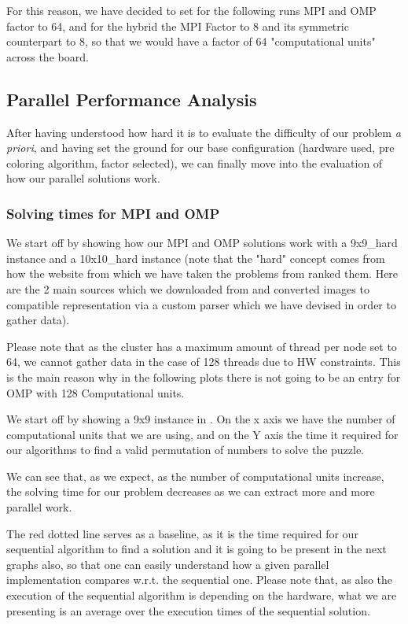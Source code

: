 For this reason, we have decided to set for the following runs MPI and OMP factor to 64, and for the hybrid the MPI Factor to 8 and its symmetric counterpart to 8, so that we would have a factor of 64 "computational units" across the board.


\subsection{Parallel Performance Analysis}
\label{subsec:parallel_performance_analysis}

After having understood how hard it is to evaluate the difficulty of our problem \textit{a priori}, and having set the ground for our base configuration (hardware used, pre coloring algorithm, factor selected), we can finally move into the evaluation of how our parallel solutions work.

\subsubsection{Solving times for MPI and OMP}
\label{subsubsec:solving_times_mpi_omp}

We start off by showing how our MPI and OMP solutions work with a 9x9\_hard instance and a 10x10\_hard instance (note that the "hard" concept comes from how the website from which we have taken the problems from ranked them. Here are the 2 main sources which we downloaded from \cite{puzzle_futoshiki,puddelbee} and converted images to compatible representation via a custom parser which we have devised in order to gather data).

Please note that as the cluster has a maximum amount of thread per node set to 64, we cannot gather data in the case of 128 threads due to HW constraints. This is the main reason why in the following plots there is not going to be an entry for OMP with 128 Computational units.


We start off by showing a 9x9 instance in . On the x axis we have the number of computational units that we are using, and on the Y axis the time it required for our algorithms to find a valid permutation of numbers to solve the puzzle.

We can see that, as we expect, as the number of computational units increase, the solving time for our problem decreases as we can extract more and more parallel work.

The red dotted line serves as a baseline, as it is the time required for our sequential algorithm to find a solution and it is going to be present in the next graphs also, so that one can easily understand how a given parallel implementation compares w.r.t. the sequential one. Please note that, as also the execution of the sequential algorithm is depending on the hardware, what we are presenting is an average over the execution times of the sequential solution.


